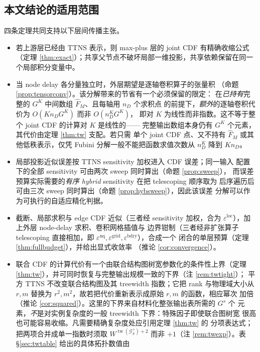 \documentclass[a4paper,11pt]{article}
\theoremstyle{definition}
\newcommand{\1}{\mathbf 1}
\newcommand{\tw}{\operatorname{tw}}
\newcommand{\Gcal}{\mathcal G}
\begin{document}
\subsection{本文结论的适用范围}

四条定理共同支持以下层间传播主张。

\begin{itemize}
\item 若上游层已经由 TTNS 表示，则 max-plus 层的 joint CDF 有精确收缩公式
（定理 \ref{thm:exact}）；共享父节点不破坏局部一维投影，共享依赖保留在同一
个局部积分变量中。
\item 当 node delay 各分量独立时，外层期望是逐轴卷积算子的张量积
（命题 \ref{prop:tensorconv}）。该分解带来的节省有一个必须保留的限定：
在\emph{已持有}完整的 $G^K$ 中间数组 $\widehat F_M$、且每轴用 $n_D$ 个求积点
的前提下，\emph{额外}的逐轴卷积代价为 $O(K n_D G^K)$ 而非 $O(n_D^K G^K)$，
即对 $K$ 为线性而非指数。这不等于整个 joint CDF 的计算对 $K$ 是线性的——
完整输出数组本身仍有 $G^K$ 个元素，其代价由定理 \ref{thm:tw} 支配。若只需
单个 joint CDF 点、又不持有 $\widehat F_M$ 或其他低秩表示，仅凭 Fubini
分解一般不能把函数求值次数从 $n_D^K$ 降到 $K n_D$。
\item 局部投影近似误差按 TTNS sensitivity 加权进入 CDF 误差；同一输入
配置下的全部 sensitivity 可由两次 sweep 同时算出（命题 \ref{prop:sweep}），
而误差预算实际需要的\emph{有序 hybrid} sensitivity 在把 telescoping 顺序取为
后序遍历后可由三次 sweep 同时算出（命题 \ref{prop:hybsweep}），因此该误差
分解可以作为可执行的自适应精化判据。
\item 截断、局部求积与 edge CDF 近似（三者经 sensitivity 加权，合为
$\varepsilon^{\mathrm{loc}}$），加上外层 node-delay 求积、卷积网格插值与
边界钳制（三者经非扩张算子 telescoping 直接相加，即
$\varepsilon^{\mathrm{nq}},\varepsilon^{\mathrm{grid}},
\varepsilon^{\mathrm{bdry}}$），合成一个
闭合的单层预算（定理 \ref{thm:fullbudget}），并给出显式收敛率
（推论 \ref{cor:convergence}）。
\item 联合 CDF 的计算代价有一个由联合结构图树宽参数化的条件性上界（定理
\ref{thm:tw}），并可同时恢复与完整输出规模一致的下界（注 \ref{rem:twtight}）；
平方 TTNS 不改变联合结构图及其 treewidth 指数；它把 rank 与物理域大小从
$r,m$ 替换为 $r^{2},m^{2}$，故若把代价重新表示成原始 $r,m$ 的函数，相应幂次
加倍
（推论 \ref{cor:squared}）。这里的下界来自材料化整张输出表所需的 $G^{s}$ 个
元素，\emph{不}是对实例复杂度的一般 treewidth 下界：特殊因子即使联合图树宽
很高也可能容易收缩。凡需要精确复杂度处应引用定理 \ref{thm:tw} 的
分项表达式；把两项合并成单一指数时须取 $W^{\tw(\Gcal_S^{+})+2}$ 而非
$+1$（注 \ref{rem:twexp}）。表 \S\ref{sec:twtable} 给出的具体拓扑数值由

\end{itemize}
\end{document}
